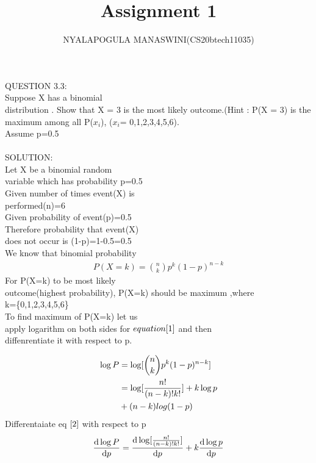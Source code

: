 \documentclass{assignment}
\begin{document}
\title{Assignment 1}
\author{NYALAPOGULA MANASWINI(CS20btech11035)}
\maketitle
\begin{paracol}{2}
\switchcolumn[0]
\begin{Large}
QUESTION 3.3:\\
Suppose X has a binomial\\
 distribution . Show that X = 3 is the most likely outcome.(Hint : P(X = 3) is the maximum among all P($x_i$), ($x_i$= 0,1,2,3,4,5,6).\\Assume p=0.5\\ 
 \\
SOLUTION:\\
Let X be a binomial random \\variable which has probability p=0.5\\
Given number of times event(X) is\\
 performed(n)=6\\
Given probability of event(p)=0.5\\
Therefore probability that event(X)\\ does not occur is
(1-p)=1-0.5=0.5\\
We know that binomial probability\\
\begin{align}
P(X=k)= \binom{n}{k}p^k({1-p})^{n-k}  \label{1} 
\end{align}
For P(X=k) to be most likely\\
outcome(highest probability),
P(X=k) should be maximum ,where\\
 k=\{0,1,2,3,4,5,6\}\\
To find maximum of P(X=k) let us\\
\switchcolumn[1]
 apply logarithm on both sides for $equation\eqref{1}$ and then \\diffenrentiate it with respect
to p.
\end{Large}
\begin{large}
\begin{align}
\log P&=\log[\binom{n}{k}p^k({1-p})^{n-k}]  \\
&=\log[\frac{n!}{(n-k)!k!}]+k \log p \notag \\
 &+(n-k)log (1-p) \label{2}
\end{align}
Differentaiate eq $\eqref{2}$ with respect to p
\begin{align}
\frac{\mathrm{d} \log P}{\mathrm{d} p}&=\frac{\mathrm{d} \log[\frac{n!}{(n-k)!k!}]}{\mathrm{d}p}+k \frac{\mathrm{d}\log p}{\mathrm{d} p} \notag \\

\end{align}
\end{large}
\end{paracol}
\end{document}

